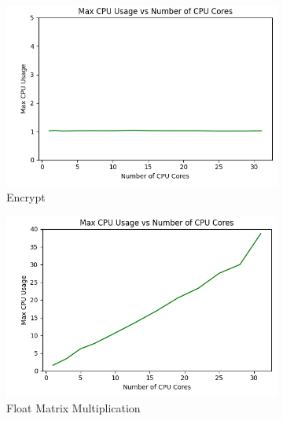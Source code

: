 \documentclass[times, 10pt,twocolumn]{article}
\begin{document}
\begin{figure}[ht]
   \centering
   \begin{subfigure}[b]{0.33\textwidth}
     \includegraphics[width=\textwidth]{imgs/study_1_results/var_cpu/encryption/CPU_CPUUsage.png}
     \caption{Encrypt}
     \label{fig:encrypt_max_cpu}
   \end{subfigure}
   \hfill
   \begin{subfigure}[b]{0.33\textwidth}
      \includegraphics[width=\textwidth]{imgs/study_1_results/var_cpu/floatmatmul/CPU_CPUUsage.png}
     \caption{Float Matrix Multiplication}
     \label{fig:floatmatmult_max_cpu}
   \end{subfigure}
   \hfill
   \begin{subfigure}[b]{0.33\textwidth}

\end{subfigure}
\end{figure}
\end{document}
